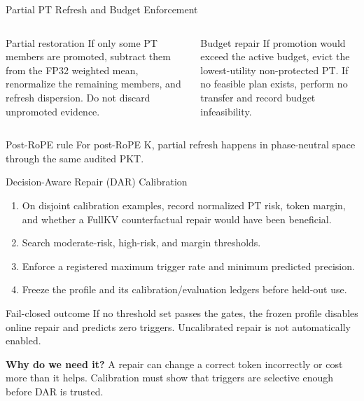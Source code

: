 \documentclass[aspectratio=169,10pt]{beamer}
\newcommand{\whylabel}{\textbf{Why do we need it?}}
\newcommand{\tightitems}{\setlength{\itemsep}{0.28em}\setlength{\parskip}{0pt}}
\begin{document}
\begin{frame}{Partial PT Refresh and Budget Enforcement}
\small
\begin{columns}[T,onlytextwidth]
\begin{block}{Partial restoration}
If only some PT members are promoted, subtract them from the FP32 weighted mean, renormalize the
remaining members, and refresh dispersion. Do not discard unpromoted evidence.
\end{block}
\begin{block}{Budget repair}
If promotion would exceed the active budget, evict the lowest-utility non-protected PT. If no
feasible plan exists, perform no transfer and record budget infeasibility.
\end{block}
\end{columns}
\begin{alertblock}{Post-RoPE rule}
For post-RoPE K, partial refresh happens in phase-neutral space through the same audited PKT.
\end{alertblock}
\end{frame}

\begin{frame}{Decision-Aware Repair (DAR) Calibration}
\small
\begin{enumerate}\tightitems
  \item On disjoint calibration examples, record normalized PT risk, token margin, and whether a
        FullKV counterfactual repair would have been beneficial.
  \item Search moderate-risk, high-risk, and margin thresholds.
  \item Enforce a registered maximum trigger rate and minimum predicted precision.
  \item Freeze the profile and its calibration/evaluation ledgers before held-out use.
\end{enumerate}
\begin{alertblock}{Fail-closed outcome}
If no threshold set passes the gates, the frozen profile disables online repair and predicts zero
triggers. Uncalibrated repair is not automatically enabled.
\end{alertblock}
\begin{exampleblock}{\whylabel}
A repair can change a correct token incorrectly or cost more than it helps. Calibration must show
that triggers are selective enough before DAR is trusted.
\end{exampleblock}
\end{frame}
\end{document}
